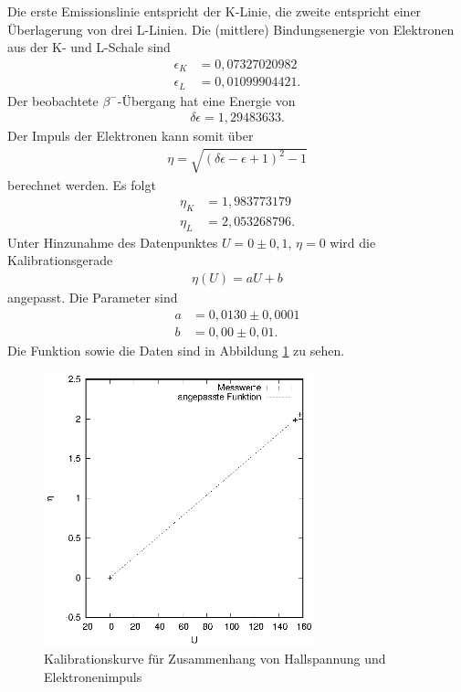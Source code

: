 Die erste Emissionslinie entspricht der K-Linie, die zweite entspricht einer Überlagerung von drei L-Linien. Die (mittlere) Bindungsenergie von Elektronen aus der K- und L-Schale sind
\begin{align*}
  \epsilon_K&=0,07327020982\\
  \epsilon_L&=0,01099904421.
\end{align*} 
Der beobachtete $\beta^-$-Übergang hat eine Energie von
\begin{align*}
  \delta\epsilon=1,29483633.
\end{align*}
Der Impuls der Elektronen kann somit über 
\begin{align*}
  \eta=\sqrt{(\delta\epsilon-\epsilon+1)^2-1}
\end{align*}
 berechnet werden. Es folgt
\begin{align*}
  \eta_K&=1,983773179\\
  \eta_L&=2,053268796.
\end{align*}
Unter Hinzunahme des Datenpunktes $U=0 \pm 0,1$, $\eta=0$ wird die Kalibrationsgerade 
\begin{align*}
  \eta(U)=aU+b
\end{align*}
angepasst. Die Parameter sind
\begin{align*}
  a&=0,0130 \pm 0,0001\\
  b&=0,00 \pm 0,01.
\end{align*}
Die Funktion sowie die Daten sind in Abbildung \ref{fig:kal} zu sehen.
\begin{figure}[h]
  \centering
  \includegraphics[width=0.7\textwidth]{data/kal.eps}
  \caption{Kalibrationskurve für Zusammenhang von Hallspannung und Elektronenimpuls}
  \label{fig:kal}
\end{figure}

